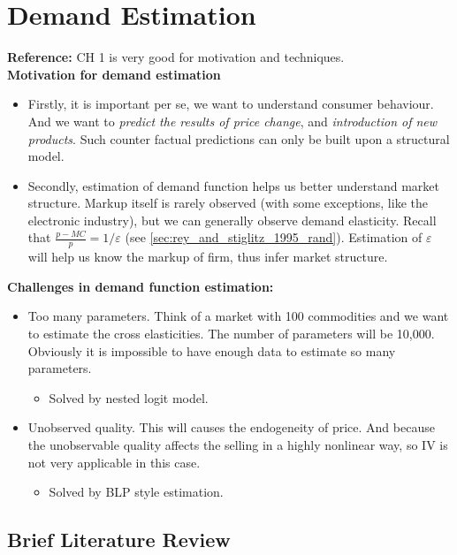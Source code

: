 \documentclass{book}
\theoremstyle{plain}
\theoremstyle{definition}
\begin{document}
\chapter{Demand Estimation} %
\label{cha:demand_estimation}

\noindent
\textbf{Reference:} \cite{shum:2016bk} CH 1 is very good for motivation and techniques.\\

\noindent
\textbf{Motivation for demand estimation}
\begin{itemize}
	\item Firstly, it is important per se, we want to understand consumer behaviour. And we want to \textit{predict the results of price change}, and \textit{introduction of new products}. 
	Such counter factual predictions can only be built upon a structural model.
	\item Secondly, estimation of demand function helps us better understand market structure. Markup itself is rarely observed (with some exceptions, like the electronic industry), but we can generally observe demand elasticity.
	Recall that $\frac{p-MC}{p}=1/\varepsilon$ (see \ref{sec:rey_and_stiglitz_1995_rand}). Estimation of $\varepsilon$ will help us know the markup of firm, thus infer market structure.
\end{itemize}



\noindent
\textbf{Challenges in demand function estimation:}
\begin{itemize}
	\item Too many parameters. Think of a market with 100 commodities and we want to estimate the cross elasticities. The number of parameters will be 10,000. Obviously it is impossible to have enough data to estimate so many parameters.
	\begin{itemize}
		\item Solved by nested logit model.
	\end{itemize}
	\item Unobserved quality. This will causes the endogeneity of price. And because the unobservable quality affects the selling in a highly nonlinear way, so IV is not very applicable in this case.
	\begin{itemize}
		\item Solved by BLP style estimation.
	\end{itemize}
\end{itemize}


\section{Brief Literature Review} %
\label{sec:brief_literature_review}
\end{document}
